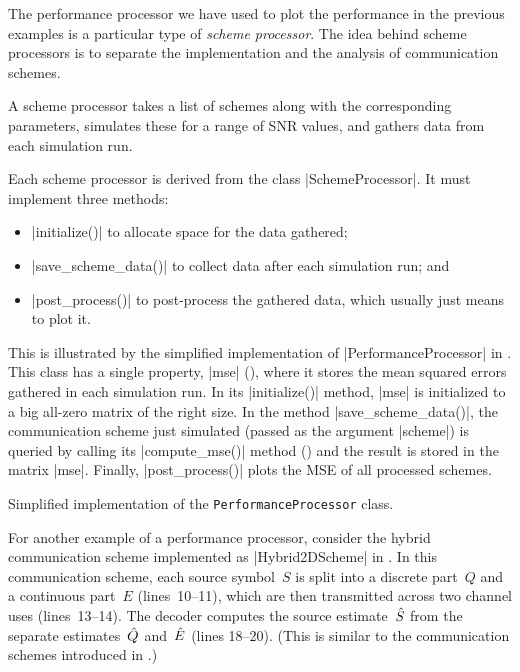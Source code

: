 The performance processor we have used to plot the performance in the previous
examples is a particular type of \emph{scheme processor}. The idea behind scheme
processors is to separate the implementation and the analysis of communication
schemes.

A scheme processor takes a list of schemes along with the corresponding
parameters, simulates these for a range of SNR values, and gathers data from
each simulation run. 

Each scheme processor is derived from the class |SchemeProcessor|. It must
implement three methods:
\begin{itemize}
  \item |initialize()| to allocate space for the data gathered;
  \item |save_scheme_data()| to collect data after each simulation run; and
  \item |post_process()| to post-process the gathered data, which usually just
    means to plot it.
\end{itemize}
This is illustrated by the simplified implementation of |PerformanceProcessor|
in . This class has a single property, |mse| (),
where it stores the mean squared errors gathered in each simulation run. In its
|initialize()| method, |mse| is initialized to a big all-zero matrix of the
right size. In the method |save_scheme_data()|, the communication scheme just
simulated (passed as the argument |scheme|) is queried by calling its
|compute_mse()| method () and the result is stored in the matrix
|mse|. Finally, |post_process()| plots the MSE of all processed schemes.

\begin{listing}
  \caption{Simplified implementation of the \texttt{PerformanceProcessor}
  class.}
  \label{lst:perfproc}
\end{listing}

For another example of a performance processor, consider the hybrid
communication scheme implemented as |Hybrid2DScheme| in .
In this communication scheme, each source symbol~$S$ is split into a discrete
part~$Q$ and a continuous part~$E$ (lines~10--11), which are then transmitted
across two
channel uses (lines~13--14).  The decoder computes the source estimate~${\hat{S}}$
from the separate estimates~$\hat{Q}$ and~$\hat{E}$ (lines 18--20). (This is similar to
the communication schemes introduced in .)

